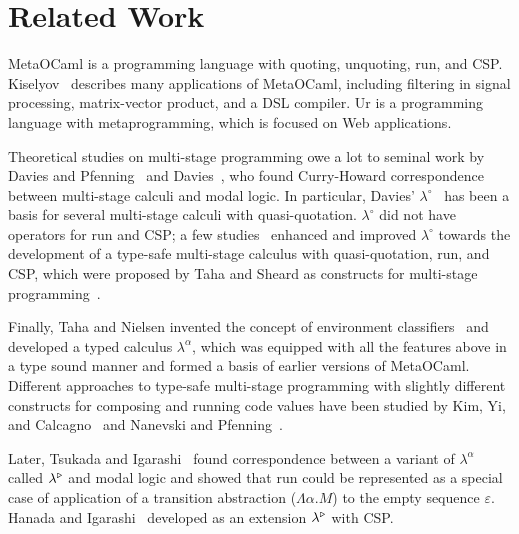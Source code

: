 
\section{Related Work}
\label{sec:related-work}


MetaOCaml is a programming language with quoting, unquoting, run, and CSP.
Kiselyov~\cite{8384206} describes many applications of MetaOCaml, including
filtering in signal processing, matrix-vector product, and a DSL compiler.
Ur\cite{chlipala2010ur} is a programming language with metaprogramming, which
is focused on Web applications.


Theoretical studies on multi-stage programming owe a lot to seminal work by
Davies and Pfenning~\cite{DaviesPfenning01JACM} and
Davies~\cite{davies1996temporal}, who found Curry-Howard correspondence
between multi-stage calculi and modal logic. In particular, Davies'
$\lambda^\circ$~\cite{davies1996temporal} has been a basis for several
multi-stage calculi with quasi-quotation. $\lambda^\circ$ did not have
operators for run and CSP; a few
studies~\cite{benaissa1999logical,MoggiTahaBenaissaSheard99ESOP} enhanced and
improved $\lambda^\circ$ towards the development of a type-safe multi-stage
calculus with quasi-quotation, run, and CSP, which were proposed by Taha and
Sheard as constructs for multi-stage programming~\cite{MetaML}.

Finally, Taha and Nielsen invented the concept of environment
classifiers~\cite{taha2003environment} and developed a typed calculus
$\lambda^\alpha$, which was equipped with all the features above in a type
sound manner and formed a basis of earlier versions of MetaOCaml. Different
approaches to type-safe multi-stage programming with slightly different
constructs for composing and running code values have been studied by Kim,
Yi, and Calcagno~\cite{DBLP:conf/popl/KimYC06} and Nanevski and
Pfenning~\cite{DBLP:journals/jfp/NanevskiP05}.

Later, Tsukada and Igarashi~\cite{Tsukada} found correspondence
between a variant of \(\lambda^\alpha\) called $\lambda^{\mathop{\triangleright}}$
and modal logic and showed that run could be represented as a special
case of application of a transition abstraction ($\Lambda\alpha.M$) to
the empty sequence $\varepsilon$.  Hanada and
Igarashi~\cite{Hanada2014} developed \LTP as an extension
$\lambda^{\mathop{\triangleright}}$ with CSP.

